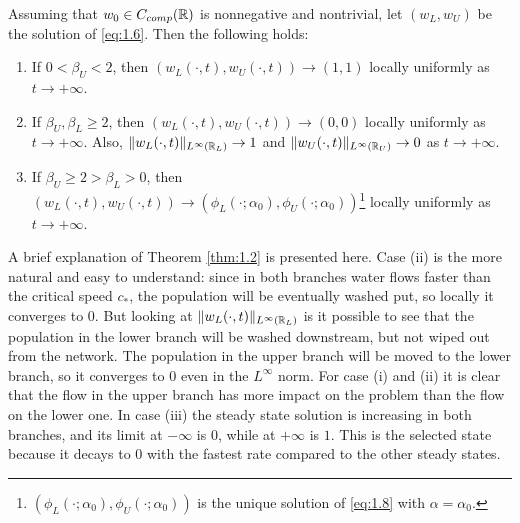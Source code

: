 \begin{theorem}
    Assuming that \(w_0 \in C_{comp}(\mathbb{R})\) is nonnegative and nontrivial, let \((w_L, w_U)\) be the solution of \eqref{eq:1.6}. Then the following holds:
    \begin{enumerate}[label=(\roman*)]
        \item If \(0 < \beta_U < 2\), then \((w_L(\cdot, t), w_U(\cdot, t)) \to (1, 1)\) locally uniformly as \(t \to +\infty\).
        \item If \(\beta_U, \beta_L \geq 2\), then \((w_L(\cdot, t), w_U(\cdot, t)) \to (0, 0)\) locally uniformly as \(t \to +\infty\). Also, \(\lVert w_L(\cdot, t)\rVert_{L^\infty(\mathbb{R}_L)} \to 1\) and \(\lVert w_U(\cdot, t)\rVert_{L^\infty(\mathbb{R}_U)} \to 0\) as \(t \to +\infty\).
        \item If \(\beta_U \geq 2 > \beta_L > 0\), then \((w_L(\cdot, t), w_U(\cdot, t)) \to (\phi_L(\cdot; \alpha_0), \phi_U(\cdot; \alpha_0))\)\footnote{\((\phi_L(\cdot; \alpha_0), \phi_U(\cdot; \alpha_0))\) is the unique solution of \eqref{eq:1.8} with \(\alpha = \alpha_0\).} locally uniformly as \(t \to +\infty\).
    \end{enumerate}
    \label{thm:1.2}
\end{theorem}

A brief explanation of Theorem \ref{thm:1.2} is presented here. Case (ii) is the more natural and easy to understand: since in both branches water flows faster than the critical speed \(c_*\), the population will be eventually washed put, so locally it converges to \(0\). But looking at \(\lVert w_L(\cdot, t)\rVert_{L^\infty(\mathbb{R}_L)}\) is it possible to see that the population in the lower branch will be washed downstream, but not wiped out from the network. The population in the upper branch will be moved to the lower branch, so it converges to \(0\) even in the \(L^\infty\) norm.
For case (i) and (ii) it is clear that the flow in the upper branch has more impact on the problem than the flow on the lower one. In case (iii) the steady state solution is increasing in both branches, and its limit at \(-\infty\) is \(0\), while at \(+\infty\) is \(1\). This is the selected state because it decays to \(0\) with the fastest rate compared to the other steady states. 

